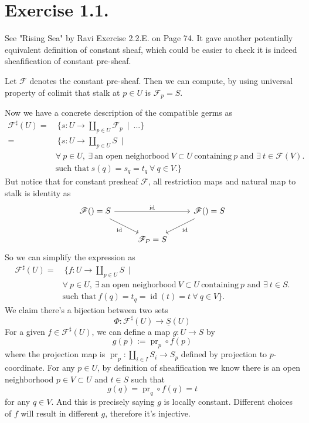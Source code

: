 \section{Exercise 1.1.}

See "Rising Sea" by Ravi Exercise 2.2.E. on Page 74. It gave another potentially equivalent definition of constant sheaf, which could be easier to check it is indeed sheafification of constant pre-sheaf.

Let $\mathscr F$ denotes the constant pre-sheaf. Then we can compute, by using universal property of colimit that stalk at $p\in U$ is $\mathscr F_p=S$. 

Now we have a concrete description of the compatible germs as 
\begin{align*}
    \mathscr F^{\sharp}(U)=&~\{s:U\to\amalg_{p\in U}\mathscr F_p ~\mid~ ...\}\\
    =&~\{s:U\to \amalg_{p\in U}S ~\mid~ \\
    &\forall~ p\in U,~ \exists~ \text{an open neighorbood}~ V\subset U~ \text{containing}~ p \text{ and } \exists~ t\in \mathscr F(V).\\
    &\text{such that}~ s(q)=s_q=t_q ~\forall~ q\in V.\}
\end{align*}
But notice that for constant presheaf $\mathscr F$, all restriction maps and natural map to stalk is identity as
\[\begin{tikzcd}
	{\mathscr F()=S} && {\mathscr F()=S} \\
	& {\mathscr F_P=S}
	\arrow["{\text{id}}", from=1-1, to=1-3]
	\arrow["{\text{id}}"', from=1-1, to=2-2]
	\arrow["{\text{id}}", from=1-3, to=2-2]
\end{tikzcd}\]
So we can simplify the expression as 
\begin{align*}
    \mathscr F^{\sharp}(U)=&~\{f:U\to \amalg_{p\in U}S ~\mid~ \\
    &\forall~ p\in U,~ \exists~ \text{an open neighorbood}~ V\subset U~ \text{containing}~ p \text{ and } \exists~ t\in S.\\
    &\text{such that}~ f(q)=t_q=\operatorname{id}(t)=t ~\forall~ q\in V\}.
\end{align*}
We claim there's a bijection between two sets 
\[\Phi:\mathscr F^{\sharp}(U)\to\underline{S}(U)\]
For a given $f\in\mathscr F^{\sharp}(U)$, we can define a map $g:U\to S$ by 
\[g(p):= \operatorname{pr}_{p}\circ f(p)\] where the projection map is $\operatorname{pr}_{p}:\amalg_{i\in I} S_i\to S_p$ defined by projection to $p$-coordinate. For any $p\in U$, by definition of sheafification we know there is an open neighborhood $p\in V\subset U$ and $t\in S$ such that 
\[g(q)=\operatorname{pr}_{q}\circ f(q)=t\] for any $q\in V$. And this is precisely saying $g$ is locally constant. Different choices of $f$ will result in different $g$, therefore it's injective. 

